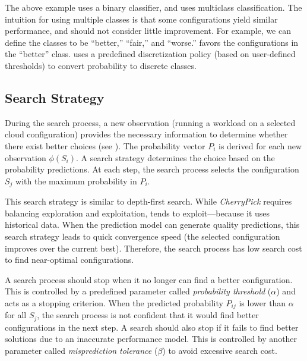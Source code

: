 The above example uses a binary classifier, and
\scout uses multiclass classification.
The intuition for using multiple classes is that some configurations
yield similar performance, and \scout should not consider little improvement.
For example, we can define the classes to be ``better,'' ``fair,'' and ``worse.''
\scout favors the configurations in the ``better'' class.
\scout uses a predefined discretization policy
(based on user-defined thresholds)  to convert probability to discrete classes.


\subsection{Search Strategy}

During the search process, a new observation
(running a workload on a selected cloud configuration)
provides the necessary information to determine
whether there exist better choices (see \myequation{\ref{eq:3}}).
The probability vector $P_{i}$ is derived
for each new observation $\phi(S_{i})$.
A search strategy determines the choice based on the probability predictions.
At each step, the search process selects the configuration $S_j$ with
the maximum probability in $P_{i}$.

This search strategy is similar to depth-first search.
While \emph{CherryPick} requires balancing exploration and exploitation,
\scout tends to exploit---because it uses historical data.
When the prediction model can generate quality predictions,
this search strategy leads to quick convergence speed
(the selected configuration improves over the current best).
Therefore, the search process has low search cost to find near-optimal
configurations. 

A search process should stop when it no longer can find a better configuration. This is controlled by a predefined parameter called  \textit{probability threshold} ($\alpha$) and acts as a stopping criterion.
When the predicted probability $P_{ij}$ is lower than $\alpha$ for all $S_j$,
the search process is not confident that it would find better configurations in the next step.
A search should also stop if it fails to find better solutions due to an inaccurate performance model. This is controlled by another parameter called \textit{ misprediction tolerance} ($\beta$) to avoid excessive search cost.

